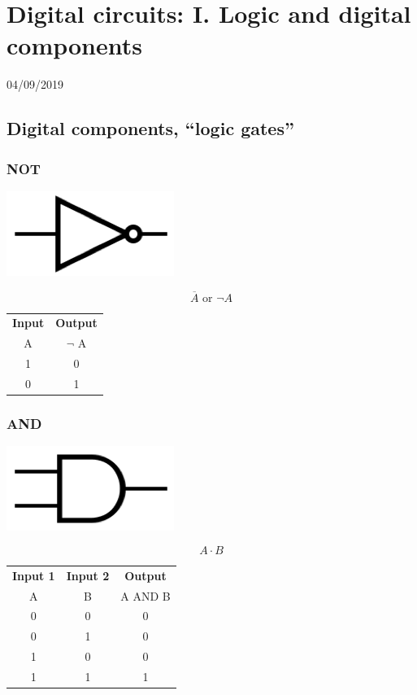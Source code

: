 \documentclass[11pt]{book}
\begin{document}
\chapter{Digital circuits: I. Logic and digital components}
04/09/2019 
\minitoc
\newpage

\section{Digital components, ``logic gates''}
\subsection{NOT}
\begin{center}
	\includegraphics{figures/20.01.png}
\end{center}
\begin{equation}
	\overline{A} \text{ or } \neg A
\end{equation}
\begin{center}
	\begin{tabular}{c c}
		\textbf{Input} & \textbf{Output} \\
		A & $\neg$ A \\
		1 & 0 \\
		0 & 1\\
	\end{tabular}
\end{center}

\subsection{AND}
\begin{center}
	\includegraphics{figures/20.02.png}
\end{center}
\begin{equation}
	A\cdot B
\end{equation}
\begin{center}
	\begin{tabular}{c c c}
		\textbf{Input 1} &  \textbf{Input 2} & \textbf{Output} \\
		A & B & A AND B \\
		0 & 0 & 0 \\
		0 & 1 & 0 \\
		1 & 0 & 0 \\
		1 & 1 & 1
	\end{tabular}
\end{center}
\end{document}
